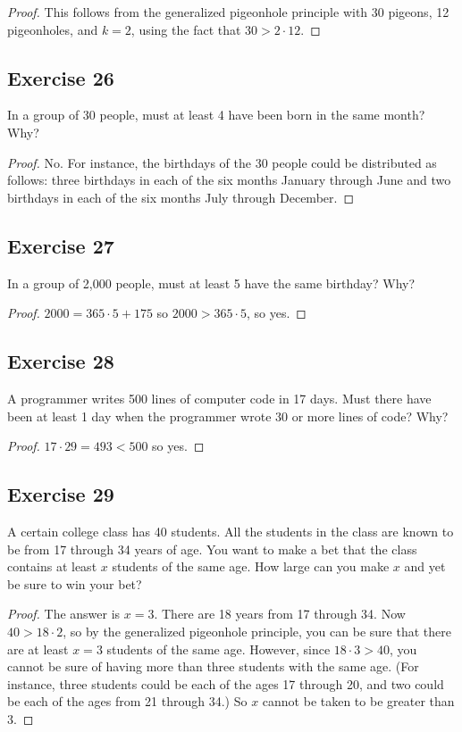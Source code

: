 \documentclass[14pt]{extarticle}
\begin{document}
\begin{proof}
This follows from the generalized pigeonhole principle with 30 pigeons, 12 pigeonholes, and \(k = 2\), using the fact that \(30 > 2 \cdot 12\).
\end{proof}

\subsection{Exercise 26}
In a group of 30 people, must at least 4 have been born in the same month? Why?

\begin{proof}
No. For instance, the birthdays of the 30 people could be distributed as follows: three birthdays in each of the six 
months January through June and two birthdays in each of the six months July through December.
\end{proof}

\subsection{Exercise 27}
In a group of 2,000 people, must at least 5 have the same birthday? Why?

\begin{proof}
\(2000 = 365 \cdot 5 + 175\) so \(2000 > 365 \cdot 5\), so yes.
\end{proof}

\subsection{Exercise 28}
A programmer writes 500 lines of computer code in 17 days. Must there have been at least 1 day when the programmer 
wrote 30 or more lines of code? Why?

\begin{proof}
\(17 \cdot 29 = 493 < 500\) so yes.
\end{proof}

\subsection{Exercise 29}
A certain college class has 40 students. All the students in the class are known to be from 17 through 34 years of 
age. You want to make a bet that the class contains at least \(x\) students of the same age. How large can you 
make \(x\) and yet be sure to win your bet?

\begin{proof}
The answer is \(x = 3\). There are 18 years from 17 through 34. Now \(40 > 18 \cdot 2\), so by the generalized 
pigeonhole principle, you can be sure that there are at least \(x = 3\) students of the same age. However, since 
\(18 \cdot 3 > 40\), you cannot be sure of having more than three students with the same age. (For instance, three 
students could be each of the ages 17 through 20, and two could be each of the ages from 21 through 34.) So \(x\) 
cannot be taken to be greater than 3.
\end{proof}
\end{document}
